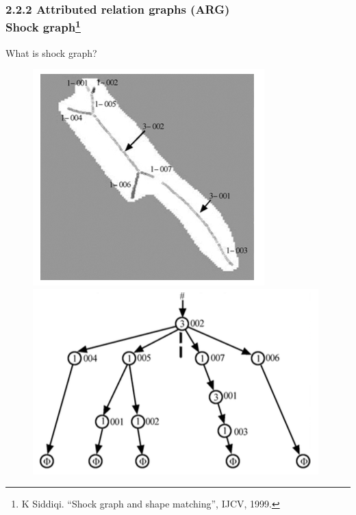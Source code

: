 \documentclass[notheorems,serif,table,compress]{beamer}  %
\begin{document}
\begin{frame}
\frametitle{2.2.2 Attributed relation graphs (ARG) \\ \normalsize{Shock graph\footnote{K Siddiqi. ``Shock graph and shape matching'', IJCV, 1999.}}}
What is shock graph?
            \begin{figure}
              \centering
              \begin{minipage}[t]{0.3\linewidth}
              \includegraphics[width=1\linewidth]{shock2} 
              \end{minipage}
              \begin{minipage}[t]{0.3\linewidth}
              \includegraphics[width=1.4\linewidth]{shock3}

\end{minipage}
\end{figure}
\end{frame}
\end{document}
